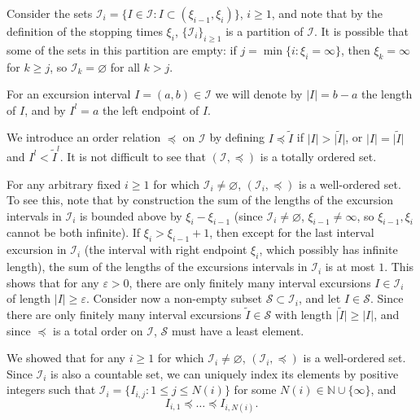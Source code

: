 \documentclass[reqno]{amsart}
\theoremstyle{definition}
\theoremstyle{remark}
\numberwithin{equation}{section}
\begin{document}
Consider the sets $\mathcal{I}_i=\{I\in \mathcal{I}: I\subset (\xi_{i-1},\xi_{i})\}$, $i\geq 1$, and note that by the definition of the stopping times $\xi_i$, $\{\mathcal{I}_i\}_{i\geq1}$ is a partition of $\mathcal{I}$. It is possible that some of the sets in this partition are empty: if $j=\min \{ i: \xi_i=\infty\}$, then $\xi_k=\infty$ for $k\geq j$, so $\mathcal{I}_k=\varnothing $ for all $k > j$.

For an excursion interval $I=(a,b)\in \mathcal{I}$ we will denote by $\vert I\vert=b-a$ the length of $I$, and by $I^l=a$ the left endpoint of $I$.

We introduce an order relation $\preceq$ on $\mathcal{I}$ by defining $I \preceq \widetilde{I}$ if $\vert I \vert >\vert \widetilde{I}\vert$, or $\vert I \vert = \vert \widetilde{I} \vert$ and $I^l < \widetilde{I}^l$. It is not difficult to see that $(\mathcal{I},\preceq )$ is a totally ordered set.

For any arbitrary fixed $i\geq 1$ for which $\mathcal{I}_i \neq \varnothing$, $(\mathcal{I}_i, \preceq )$ is a well-ordered set. To see this, note that by construction the sum of the lengths of the excursion intervals in $\mathcal{I}_i$ is bounded above by $\xi_{i}-\xi_{i-1}$ (since $\mathcal{I}_i\neq \varnothing$, $\xi_{i-1}\neq \infty$, so $\xi_{i-1}, \xi_{i}$ cannot be both infinite). If $\xi_{i} > \xi_{i-1}+1$, then except for the last interval excursion in $\mathcal{I}_i$ (the interval with right endpoint $\xi_i$, which possibly has infinite length), the sum of the lengths of the excursions intervals in $\mathcal{I}_i$ is at most $1$. This shows that for any $\varepsilon >0$, there are only finitely many interval excursions $I\in \mathcal{I}_i$ of length $\vert I \vert \geq \varepsilon $. Consider now a non-empty subset $\mathcal{S}\subset \mathcal{I}_i$, and let $I\in \mathcal{S}$. Since there are only finitely many interval excursions $\widetilde{I}\in \mathcal{S}$ with length $\vert \widetilde{I}\vert \geq \vert I\vert$, and since $\preceq$ is a total order on $\mathcal{I}$, $\mathcal{S}$ must have a least element.

We showed that for any $i\geq 1$ for which $\mathcal{I}_i\neq \varnothing$, $(\mathcal{I}_i,\preceq)$ is a well-ordered set. Since $\mathcal{I}_i$ is also a countable set, we can uniquely index its elements by positive integers such that $\mathcal{I}_i=\{I_{i,j}:1\leq j \leq N(i)\}$ for some $N(i)\in \mathbb{N}\cup \{\infty\}$, and
\begin{equation}
I_{i,1}\preceq \ldots \preceq I_{i,N(i)}.
\end{equation}
\end{document}
